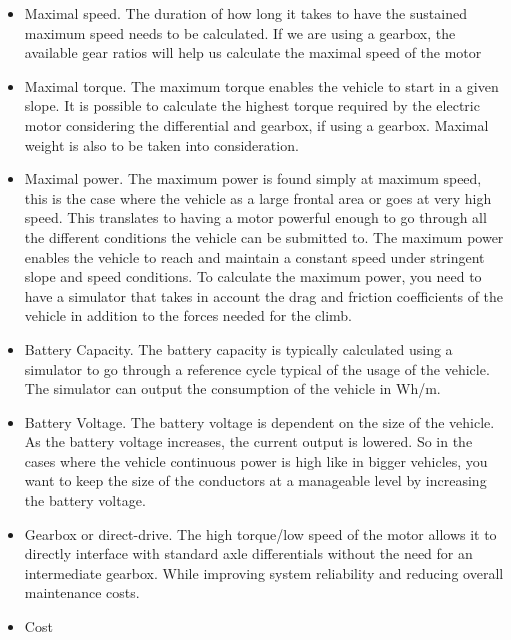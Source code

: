 \begin{itemize}

    \item Maximal speed.
    The duration of how long it takes to have the sustained maximum speed needs to be calculated.
    If we are using a gearbox, the available gear ratios will help us calculate the maximal speed of the motor
    \item Maximal torque.
    The maximum torque enables the vehicle to start in a given slope.
    It is possible to calculate the highest torque required by the electric motor considering the differential and gearbox, if using a gearbox.
    Maximal weight is also to be taken into consideration.
        
    \item Maximal power.
    The maximum power is found simply at maximum speed, this is the case where the vehicle as a large frontal area or goes at very high speed.
    This translates to having a motor powerful enough to go through all the different conditions the vehicle can be submitted to.
    The maximum power enables the vehicle to reach and maintain a constant speed under stringent slope and speed conditions.
    To calculate the maximum power, you need to have a simulator that takes in account the drag and friction coefficients of the vehicle in addition to the forces needed for the climb.
    
    \item Battery Capacity.
    The battery capacity is typically calculated using a simulator to go through a reference cycle typical of the usage of the vehicle.
    The simulator can output the consumption of the vehicle in Wh/m.
    
    \item Battery Voltage.
    The battery voltage is dependent on the size of the vehicle.
    As the battery voltage increases, the current output is lowered.
    So in the cases where the vehicle continuous power is high like in bigger vehicles, you want to keep the size of the conductors at a manageable level by increasing the battery voltage.

    \item Gearbox or direct-drive.
    The high torque/low speed of the motor allows it to directly interface with standard axle differentials without the need for an intermediate gearbox.
    While improving system reliability and reducing overall maintenance costs.
    
    \item Cost
    
\end{itemize}


